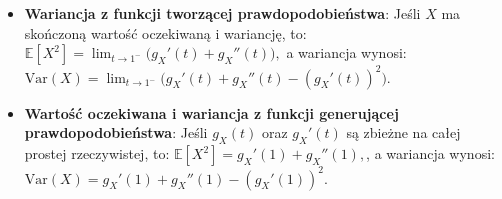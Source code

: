 \documentclass{article}
\theoremstyle{definition}
\theoremstyle{remark}
\begin{document}
\begin{multicols}{2}
\begin{itemize}
    \item \textbf{Wariancja z funkcji tworzącej prawdopodobieństwa}: 
    Jeśli \( X \) ma skończoną wartość oczekiwaną i wariancję, to:
    \(
    \mathbb{E}[X^2] = \lim_{t \to 1^-} \big(g_X'(t) + g_X''(t)\big),
    \)
    a wariancja wynosi:
    \(
    \mathrm{Var}(X) = \lim_{t \to 1^-} \big(g_X'(t) + g_X''(t) - (g_X'(t))^2\big).
    \)
    
    \item \textbf{Wartość oczekiwana i wariancja z funkcji generującej prawdopodobieństwa}: 
    Jeśli \( g_X(t) \) oraz \( g_X'(t) \) są zbieżne na całej prostej rzeczywistej, to:
    \(
    \mathbb{E}[X^2] = g_X'(1) + g_X''(1),
    \), a wariancja wynosi:
    \(
    \text{Var}(X) = g_X'(1) + g_X''(1) - (g_X'(1))^2.
    \)
    
    \end{itemize}




\end{multicols}
\end{document}
